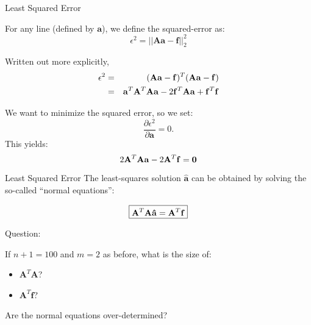\documentclass[xcolor=dvipsnames,11pt]{beamer}
\newcommand{\highlight}[1]{\textcolor{BrickRed}{#1}}
\begin{document}
\begin{frame}{Least Squared Error}

For any line (defined by $\mathbf{a}$), we define the squared-error as:
$$\epsilon^2 =  ||\mathbf{A a} - \mathbf{f}||_{2}^2$$


Written out more explicitly,
%
\begin{eqnarray*}
\epsilon^2 & = & (\mathbf{A a} - \mathbf{f})^{T} (\mathbf{A a} - \mathbf{f})\\
& = & \mathbf{a}^T  \mathbf{A}^T \mathbf{A  a} - 2 {\bf f}^T \mathbf{A  a} + {\bf f}^T {\bf f}
\end{eqnarray*}


We want to minimize the squared error, so we set:
%
$$\frac{\partial \epsilon^2}{\partial \mathbf{a}} = 0.$$
%
This yields:
$$2 \mathbf{A}^T \mathbf{A  a} - 2 {\bf A}^T \mathbf{f} = {\bf 0}$$

\end{frame}

\begin{frame}{Least Squared Error}
The least-squares solution $\hat{\mathbf{a}}$ can be obtained by solving the so-called ``normal equations'':

$$\boxed{\mathbf{A}^T \mathbf{A  \hat{a}} = {\bf A}^T \mathbf{f}}$$


\highlight{Question}:

If $n + 1 = 100$ and $m = 2$ as before, what is the size of:

\begin{itemize}
\item  $\mathbf{A}^T \mathbf{A}$?
\item $\mathbf{A}^T \mathbf{f}$?
\end{itemize}


Are the normal equations over-determined?

\end{frame}
\end{document}
